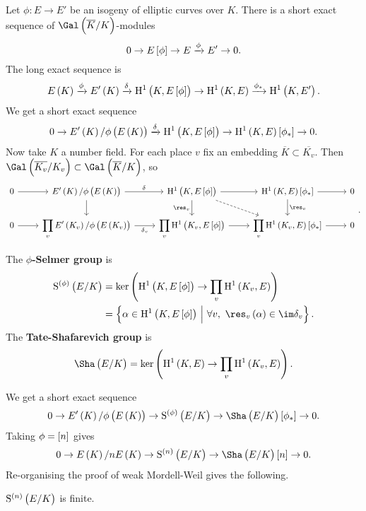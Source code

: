 Let $ \phi : E \to E' $ be an isogeny of elliptic curves over $ K $. There is a short exact sequence of $ \Gal\br{\overline{K} / K} $-modules
$$ 0 \to E\sbr{\phi} \to E \xrightarrow{\phi} E' \to 0. $$
The long exact sequence is
$$ E\br{K} \xrightarrow{\phi} E'\br{K} \xrightarrow{\delta} \H^1\br{K, E\sbr{\phi}} \to \H^1\br{K, E} \xrightarrow{\phi_*} \H^1\br{K, E'}. $$
We get a short exact sequence
$$ 0 \to E'\br{K} / \phi\br{E\br{K}} \xrightarrow{\delta} \H^1\br{K, E\sbr{\phi}} \to \H^1\br{K, E}\sbr{\phi_*} \to 0. $$
Now take $ K $ a number field. For each place $ v $ fix an embedding $ \overline{K} \subset \overline{K_v} $. Then $ \Gal\br{\overline{K_v} / K_v} \subset \Gal\br{\overline{K} / K} $, so
$$
\begin{tikzcd}
0 \arrow{r} & E'\br{K} / \phi\br{E\br{K}} \arrow{r}{\delta} \arrow{d} & \H^1\br{K, E\sbr{\phi}} \arrow{r} \arrow{d}[swap]{\res_v} \arrow[dashed]{dr} & \H^1\br{K, E}\sbr{\phi_*} \arrow{r} \arrow{d}{\res_v} & 0 \\
0 \arrow{r} & \displaystyle\prod_v E'\br{K_v} / \phi\br{E\br{K_v}} \arrow{r}[swap]{\delta_v} & \displaystyle\prod_v \H^1\br{K_v, E\sbr{\phi}} \arrow{r} & \displaystyle\prod_v \H^1\br{K_v, E}\sbr{\phi_*} \arrow{r} & 0
\end{tikzcd}.
$$

\begin{definition*}
The \textbf{$ \phi $-Selmer group} is
\begin{align*}
\S^{\br{\phi}}\br{E / K}
& = \ker \br{\H^1\br{K, E\sbr{\phi}} \to \prod_v \H^1\br{K_v, E}} \\
& = \cbr{\alpha \in \H^1\br{K, E\sbr{\phi}} \st \forall v, \ \res_v\br{\alpha} \in \im \delta_v}.
\end{align*}
The \textbf{Tate-Shafarevich group} is
$$ \Sha\br{E / K} = \ker \br{\H^1\br{K, E} \to \prod_v \H^1\br{K_v, E}}. $$
\end{definition*}

We get a short exact sequence
$$ 0 \to E'\br{K} / \phi\br{E\br{K}} \to \S^{\br{\phi}}\br{E / K} \to \Sha\br{E / K}\sbr{\phi_*} \to 0. $$
Taking $ \phi = \sbr{n} $ gives
$$ 0 \to E\br{K} / nE\br{K} \to \S^{\br{n}}\br{E / K} \to \Sha\br{E / K}\sbr{n} \to 0. $$
Re-organising the proof of weak Mordell-Weil gives the following.

\pagebreak

\begin{theorem}
$ \S^{\br{n}}\br{E / K} $ is finite.
\end{theorem}

